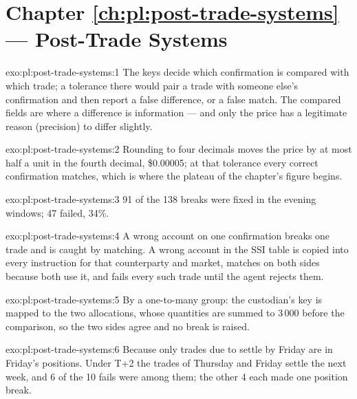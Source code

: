 \section*{Chapter \ref{ch:pl:post-trade-systems} --- Post-Trade Systems}

\begin{solution}{exo:pl:post-trade-systems:1}
The keys decide which confirmation is compared with which trade; a tolerance there would pair a trade with someone else's confirmation and
then report a false difference, or a false match. The compared fields are where a difference is information --- and only the price has a
legitimate reason (precision) to differ slightly.
\end{solution}

\begin{solution}{exo:pl:post-trade-systems:2}
Rounding to four decimals moves the price by at most half a unit in the fourth decimal, \$0.00005; at that tolerance every correct confirmation
matches, which is where the plateau of the chapter's figure begins.
\end{solution}

\begin{solution}{exo:pl:post-trade-systems:3}
91 of the 138 breaks were fixed in the evening windows; 47 failed, 34\%.
\end{solution}

\begin{solution}{exo:pl:post-trade-systems:4}
A wrong account on one confirmation breaks one trade and is caught by matching. A wrong account in the SSI table is copied into every
instruction for that counterparty and market, matches on both sides because both use it, and fails every such trade until the agent rejects
them.
\end{solution}

\begin{solution}{exo:pl:post-trade-systems:5}
By a one-to-many group: the custodian's key is mapped to the two allocations, whose quantities are summed to 3\,000 before the comparison, so
the two sides agree and no break is raised.
\end{solution}

\begin{solution}{exo:pl:post-trade-systems:6}
Because only trades due to settle by Friday are in Friday's positions. Under T+2 the trades of Thursday and Friday settle the next week, and 6 of
the 10 fails were among them; the other 4 each made one position break.
\end{solution}

